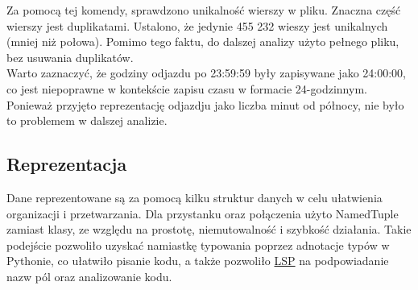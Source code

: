 \documentclass[a4paper, 12pt]{article}
\begin{document}
    Za pomocą tej komendy, sprawdzono unikalność wierszy w pliku. Znaczna część wierszy jest duplikatami.
    Ustalono, że jedynie 455 232 wieszy jest unikalnych (mniej niż połowa).
    Pomimo tego faktu, do dalszej analizy użyto pełnego pliku, bez usuwania duplikatów. \\
    Warto zaznaczyć, że godziny odjazdu po 23:59:59 były zapisywane jako 24:00:00, co jest niepoprawne w kontekście
    zapisu czasu w formacie 24-godzinnym. Ponieważ przyjęto reprezentację odjazdju jako liczba minut od północy,
    nie było to problemem w dalszej analizie. \\

  \subsection{Reprezentacja}
    Dane reprezentowane są za pomocą kilku struktur danych w celu ułatwienia organizacji i przetwarzania.
    Dla przystanku oraz połączenia użyto NamedTuple zamiast klasy, ze względu na prostotę, niemutowalność
    i szybkość działania. Takie podejście pozwoliło uzyskać namiastkę typowania poprzez adnotacje typów
    w Pythonie, co ułatwiło pisanie kodu, a także pozwoliło \href{https://microsoft.github.io/language-server-protocol/}{\color{gruvbox-purple}LSP}
    na podpowiadanie nazw pól oraz analizowanie kodu.
\end{document}

